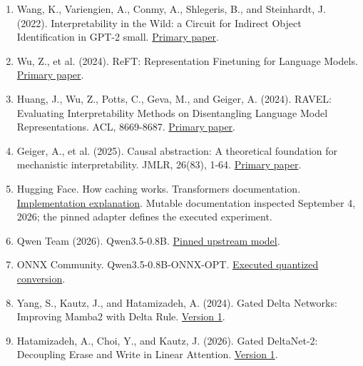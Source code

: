 \documentclass[11pt,letterpaper]{article}
\begin{document}
\begin{enumerate}[label=\arabic*.,itemsep=0.35em]
\item\label{ref:16}\begingroup{} Wang, K., Variengien, A., Conmy, A., Shlegeris, B., and Steinhardt, J. (2022). Interpretability in the Wild: a Circuit for Indirect Object Identification in GPT-2 small. \href{https://arxiv.org/abs/2211.00593}{Primary paper}.\par\endgroup
\item\label{ref:17}\begingroup{} Wu, Z., et al. (2024). ReFT: Representation Finetuning for Language Models. \href{https://arxiv.org/abs/2404.03592}{Primary paper}.\par\endgroup
\item\label{ref:18}\begingroup{} Huang, J., Wu, Z., Potts, C., Geva, M., and Geiger, A. (2024). RAVEL: Evaluating Interpretability Methods on Disentangling Language Model Representations. ACL, 8669-8687. \href{https://aclanthology.org/2024.acl-long.470/}{Primary paper}.\par\endgroup
\item\label{ref:19}\begingroup{} Geiger, A., et al. (2025). Causal abstraction: A theoretical foundation for mechanistic interpretability. JMLR, 26(83), 1-64. \href{https://jmlr.org/papers/v26/23-0058.html}{Primary paper}.\par\endgroup
\item\label{ref:20}\begingroup{} Hugging Face. How caching works. Transformers documentation. \href{https://huggingface.co/docs/transformers/main/en/cache_explanation}{Implementation explanation}. Mutable documentation inspected September 4, 2026; the pinned adapter defines the executed experiment.\par\endgroup
\item\label{ref:21}\begingroup{} Qwen Team (2026). Qwen3.5-0.8B. \href{https://huggingface.co/Qwen/Qwen3.5-0.8B/tree/2fc06364715b967f1860aea9cf38778875588b17}{Pinned upstream model}.\par\endgroup
\item\label{ref:22}\begingroup{} ONNX Community. Qwen3.5-0.8B-ONNX-OPT. \href{https://huggingface.co/onnx-community/Qwen3.5-0.8B-ONNX-OPT/tree/fafab72d87a9e6be3925b38caf48286d2838f2d0}{Executed quantized conversion}.\par\endgroup
\item\label{ref:23}\begingroup{} Yang, S., Kautz, J., and Hatamizadeh, A. (2024). Gated Delta Networks: Improving Mamba2 with Delta Rule. \href{https://arxiv.org/html/2412.06464v1}{Version 1}.\par\endgroup
\item\label{ref:24}\begingroup{} Hatamizadeh, A., Choi, Y., and Kautz, J. (2026). Gated DeltaNet-2: Decoupling Erase and Write in Linear Attention. \href{https://arxiv.org/html/2605.22791v1}{Version 1}.\par\endgroup

\end{enumerate}
\end{document}
